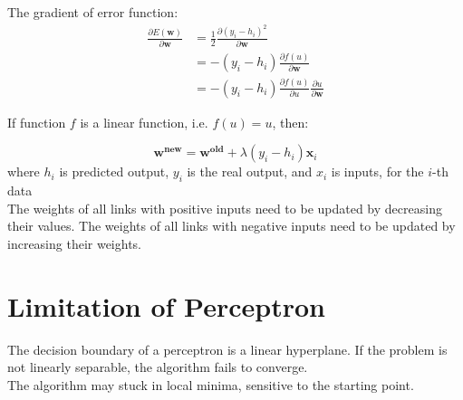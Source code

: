 \begin{multicols}{2}
\noindent The gradient of error function:
\begin{equation*}
\begin{split}
\frac{\partial E(\mathbf{w})}{\partial \mathbf{w}} &= \frac{1}{2} \frac{\partial (y_i-h_i)^{2}}{\partial \mathbf{w}} \\
&= - (y_i-h_i) \frac{\partial f(u)}{\partial \mathbf{w}} \\
&= - (y_i-h_i) \frac{\partial f(u)}{\partial u} \frac{\partial u}{\partial \mathbf{w}}
\end{split}
\end{equation*}

\noindent If function $f$ is a linear function, i.e. $f(u) = u$, then:

$$\mathbf{w^{new}} = \mathbf{w^{old}} + \lambda (y_i - h_i) \mathbf{x}_i$$
\noindent where $h_i$ is predicted output, $y_i$ is the real output, and $x_i$ is inputs, for the $i$-th data \\

\noindent The weights of all links with positive inputs need to be updated by decreasing their values. The weights of all links with negative inputs need to be updated by increasing their weights.

\section{Limitation of Perceptron}

\noindent The decision boundary of a perceptron is a linear hyperplane. If the problem is not linearly separable, the algorithm fails to converge. \\

\noindent The algorithm may stuck in local minima, sensitive to the starting point.


\end{multicols}
